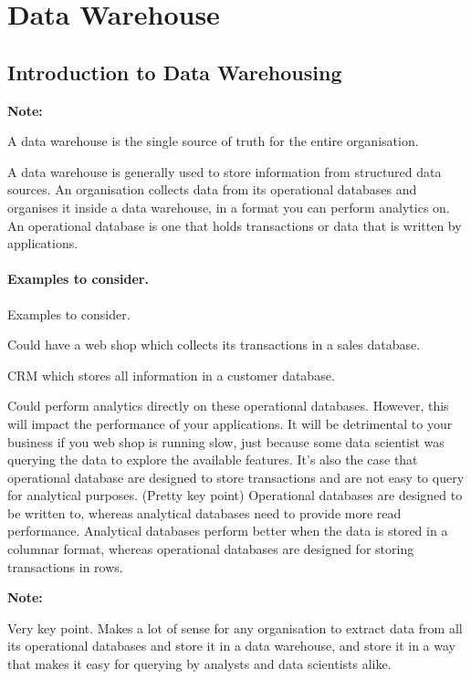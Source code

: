 \documentclass[a4paper, 11pt]{article}
\newenvironment{note}{
    \begin{siderule}
        \textbf{Note: }
        }{
    \end{siderule}}
\begin{document}

    \section{Data Warehouse}

    \subsection{Introduction to Data Warehousing}

    \begin{note}
    A data warehouse is the single source of truth for the entire organisation.
    \end{note}

    A data warehouse is generally used to store information from structured data sources.
    An organisation collects data from its operational databases and organises it inside a data warehouse, in a format you can perform analytics on.
    An operational database is one that holds transactions or data that is written by applications.

    \paragraph{Examples to consider.}
    Examples to consider.
    \begin{item}
        \item Could have a web shop which collects its transactions in a sales database.
        \item CRM which stores all information in a customer database.
    \end{item}

    Could perform analytics directly on these operational databases.
    However, this will impact the performance of your applications.
    It will be detrimental to your business if you web shop is running slow, just because some data scientist was querying the data to explore the available features.
    It's also the case that operational database are designed to store transactions and are not easy to query for analytical purposes. (Pretty key point)
    Operational databases are designed to be written to, whereas analytical databases need to provide more read performance.
    Analytical databases perform better when the data is stored in a columnar format, whereas operational databases are designed for storing transactions in rows.

    \begin{note}
        Very key point.
        Makes a lot of sense for any organisation to extract data from all its operational databases and store it in a data warehouse,
        and store it in a way that makes it easy for querying by analysts and data scientists alike.
    \end{note}
\end{document}
